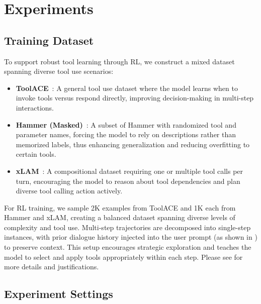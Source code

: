 \section{Experiments}

\subsection{Training Dataset}
To support robust tool learning through RL, we construct a mixed dataset spanning diverse tool use scenarios:

\begin{itemize}[topsep=2pt, leftmargin=10pt, itemsep=-2pt]
\item \textbf{ToolACE}~\citep{liu2024toolace}: A general tool use dataset where the model learns when to invoke tools versus respond directly, improving decision-making in multi-step interactions.

\item \textbf{Hammer (Masked)}~\citep{lin2024hammer}: A subset of Hammer with randomized tool and parameter names, forcing the model to rely on descriptions rather than memorized labels, thus enhancing generalization and reducing overfitting to certain tools.

\item \textbf{xLAM}~\citep{zhang2024xlam}: A compositional dataset requiring one or multiple tool calls per turn, encouraging the model to reason about tool dependencies and plan diverse tool calling action actively.
\end{itemize}

For RL training, we sample 2K examples from ToolACE and 1K each from Hammer and xLAM, creating a balanced dataset spanning diverse levels of complexity and tool use. Multi-step trajectories are decomposed into single-step instances, with prior dialogue history injected into the user prompt (as shown in ) to preserve context. This setup encourages strategic exploration and teaches the model to select and apply tools appropriately within each step. Please see  for more details and justifications.

\subsection{Experiment Settings}
